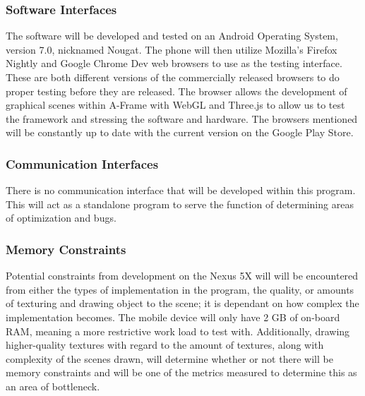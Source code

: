 \documentclass[letterpaper,10pt,draftclsnofoot,onecolumn,compsoc]{IEEEtran}
\begin{document}
\begin{singlespace}
\subsubsection{Software Interfaces}
\begin{singlespace}
\noindent
The software will be developed and tested on an Android Operating System, version 7.0, nicknamed Nougat. The phone will then utilize Mozilla's Firefox Nightly and Google Chrome Dev web browsers to use as the testing interface. These are both different versions of the commercially released browsers to do proper testing before they are released. The browser allows the development of graphical scenes within A-Frame with WebGL and Three.js to allow us to test the framework and stressing the software and hardware. The browsers mentioned will be constantly up to date with the current version on the Google Play Store.
\end{singlespace}

\subsubsection{Communication Interfaces}
\begin{singlespace}
\noindent
There is no communication interface that will be developed within this program. This will act as a standalone program to serve the function of determining areas of optimization and bugs.
\end{singlespace}

\subsubsection{Memory Constraints}
\begin{singlespace}
\noindent
Potential constraints from development on the Nexus 5X will will be encountered from either the types of implementation in the program, the quality, or amounts of texturing and drawing object to the scene; it is dependant on how complex the implementation becomes. The mobile device will only have 2 GB of on-board RAM, meaning a more restrictive work load to test with. Additionally, drawing higher-quality textures with regard to the amount of textures, along with complexity of the scenes drawn, will determine whether or not there will be memory constraints and will be one of the metrics measured to determine this as an area of bottleneck.
\end{singlespace}

\end{singlespace}
\end{document}
